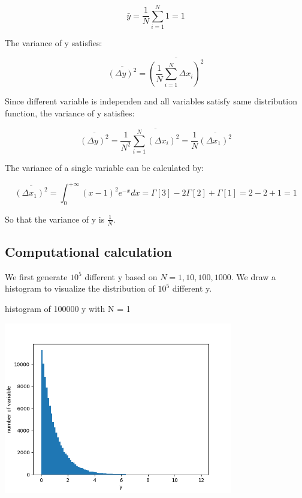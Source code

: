 \documentclass[letterpaper,12pt]{article}
\begin{document}
\begin{equation}
    \bar{y} =\frac{1}{N}\sum_{i=1}^{N}1 = 1
\end{equation}

The variance of y satisfies:

\begin{equation}
    \overline{(\Delta y)^2} =\overline{(\frac{1}{N}\sum_{i=1}^{N}\Delta x_i)^2}
\end{equation}

Since different variable is independen and all variables satisfy same distribution function, the variance of y satisfies:

\begin{equation}
    \overline{(\Delta y)^2} = \frac{1}{N^2}\overline{\sum_{i=1}^{N}(\Delta x_i)^2} = \frac{1}{N} \overline{(\Delta x_1)^2}
\end{equation}

The variance of a single variable can be calculated by:

\begin{equation}
    \overline{(\Delta x_1)^2} = \int_0^{+\infty} (x - 1)^2 e^{-x} dx = \Gamma[3] - 2\Gamma[2] + \Gamma[1] = 2 - 2 + 1 = 1
\end{equation}

So that the variance of y is $\frac{1}{N}$.

\subsection{Computational calculation}

We first generate $10^5$ different y based on $N = 1,10,100,1000$. We draw a histogram to visualize the distribution of $10^5$ different y.

\begin{table}[!h]
    \centering
    \caption{histogram of 100000 y with N = 1}
    \includegraphics[width=10cm]{ps3-41.png}
    \label{plot1}%
\end{table}%
\end{document}
